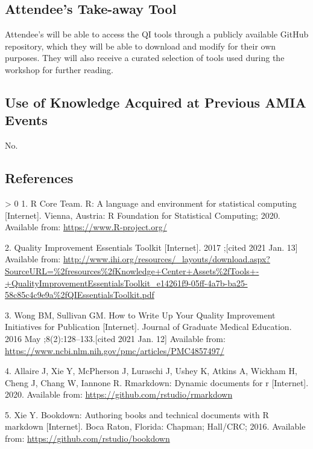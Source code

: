 \documentclass[
]{article}
\newlength{\cslhangindent}
\newenvironment{CSLReferences}[3] %
 {%
  \setlength{\parindent}{0pt}
  \ifodd #1 \everypar{\setlength{\hangindent}{\cslhangindent}}\ignorespaces\fi
  \ifnum #2 > 0
  \setlength{\parskip}{#2\baselineskip}
  \fi
 }%
 {}
\begin{document}
\hypertarget{attendees-take-away-tool}{%
\subsection{Attendee's Take-away Tool}\label{attendees-take-away-tool}}

Attendee's will be able to access the QI tools through a publicly available GitHub repository, which they will be able to download and modify for their own purposes. They will also receive a curated selection of tools used during the workshop for further reading.

\hypertarget{use-of-knowledge-acquired-at-previous-amia-events}{%
\subsection{Use of Knowledge Acquired at Previous AMIA Events}\label{use-of-knowledge-acquired-at-previous-amia-events}}

No.~

\hypertarget{references}{%
\subsection*{References}\label{references}}

\hypertarget{refs}{}
\begin{CSLReferences}{0}{0}
\leavevmode\hypertarget{ref-R-base}{}%
1. R Core Team. R: A language and environment for statistical computing {[}Internet{]}. Vienna, Austria: R Foundation for Statistical Computing; 2020. Available from: \url{https://www.R-project.org/}

\leavevmode\hypertarget{ref-noauthor_quality_2017}{}%
2. Quality {Improvement} {Essentials} {Toolkit} {[}Internet{]}. 2017 ;{[}cited 2021 Jan. 13{]} Available from: \url{http://www.ihi.org/resources/_layouts/download.aspx?SourceURL=\%2fresources\%2fKnowledge+Center+Assets\%2fTools+-+QualityImprovementEssentialsToolkit_e14261f9-05ff-4a7b-ba25-58c85c4c9e9a\%2fQIEssentialsToolkit.pdf}

\leavevmode\hypertarget{ref-wong_how_2016}{}%
3. Wong BM, Sullivan GM. How to {Write} {Up} {Your} {Quality} {Improvement} {Initiatives} for {Publication} {[}Internet{]}. Journal of Graduate Medical Education. 2016 May ;8(2):128--133.{[}cited 2021 Jan. 12{]} Available from: \url{https://www.ncbi.nlm.nih.gov/pmc/articles/PMC4857497/}

\leavevmode\hypertarget{ref-R-rmarkdown}{}%
4. Allaire J, Xie Y, McPherson J, Luraschi J, Ushey K, Atkins A, Wickham H, Cheng J, Chang W, Iannone R. Rmarkdown: Dynamic documents for r {[}Internet{]}. 2020. Available from: \url{https://github.com/rstudio/rmarkdown}

\leavevmode\hypertarget{ref-bookdown2016}{}%
5. Xie Y. Bookdown: Authoring books and technical documents with {R} markdown {[}Internet{]}. Boca Raton, Florida: Chapman; Hall/CRC; 2016. Available from: \url{https://github.com/rstudio/bookdown}

\end{CSLReferences}
\end{document}
